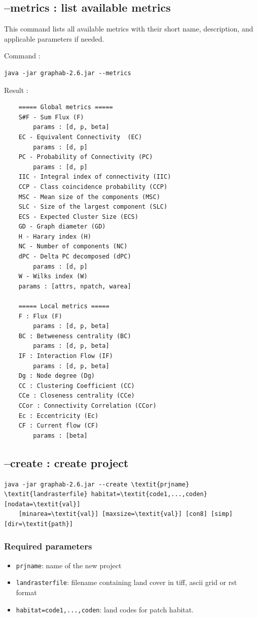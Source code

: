 \documentclass[a4paper,10pt]{report}
\begin{document}
\subsection{--metrics : list available metrics}
This command lists all available metrics with their short name, description, and applicable parameters if needed.

Command :
\begin{Verbatim}
java -jar graphab-2.6.jar --metrics
\end{Verbatim}
Result :
\begin{Verbatim}
	===== Global metrics =====
	S#F - Sum Flux (F)
		params : [d, p, beta]
	EC - Equivalent Connectivity  (EC)
		params : [d, p]
	PC - Probability of Connectivity (PC)
		params : [d, p]
	IIC - Integral index of connectivity (IIC)
	CCP - Class coincidence probability (CCP)
	MSC - Mean size of the components (MSC)
	SLC - Size of the largest component (SLC)
	ECS - Expected Cluster Size (ECS)
	GD - Graph diameter (GD)
	H - Harary index (H)
	NC - Number of components (NC)
	dPC - Delta PC decomposed (dPC)
		params : [d, p]
	W - Wilks index (W)
	params : [attrs, npatch, warea]
	
	===== Local metrics =====
	F : Flux (F)
		params : [d, p, beta]
	BC : Betweeness centrality (BC)
		params : [d, p, beta]
	IF : Interaction Flow (IF)
		params : [d, p, beta]
	Dg : Node degree (Dg)
	CC : Clustering Coefficient (CC)
	CCe : Closeness centrality (CCe)
	CCor : Connectivity Correlation (CCor)
	Ec : Eccentricity (Ec)
	CF : Current flow (CF)
		params : [beta]
\end{Verbatim}

\subsection{--create : create project}

\begin{Verbatim}[commandchars=\\\{\}]
java -jar graphab-2.6.jar --create \textit{prjname} \textit{landrasterfile} habitat=\textit{code1,...,coden} [nodata=\textit{val}] 
	[minarea=\textit{val}] [maxsize=\textit{val}] [con8] [simp] [dir=\textit{path}]
\end{Verbatim}

\subsubsection{Required parameters}
\begin{itemize}
	\item \verb|prjname|: name of the new project
	\item \verb|landrasterfile|: filename containing land cover in tiff, ascii grid or rst format
	\item \verb|habitat=code1,...,coden|: land codes for patch habitat.
\end{itemize}
\end{document}
